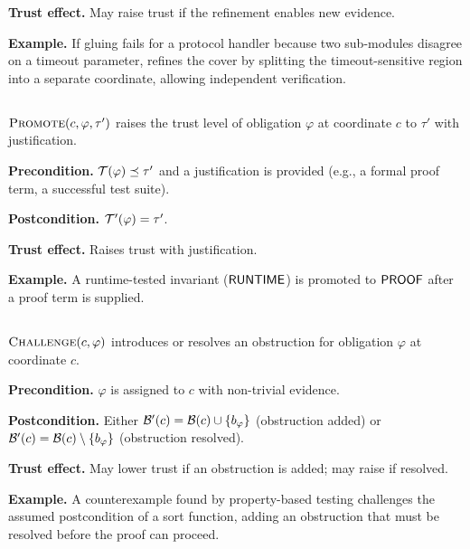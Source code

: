 \documentclass[11pt]{article}
\begin{document}
\noindent\textbf{Trust effect.}
May raise trust if the refinement enables new evidence.

\noindent\textbf{Example.}
If gluing fails for a protocol handler because two sub-modules
disagree on a timeout parameter, \REPAIR{} refines the cover by
splitting the timeout-sensitive region into a separate coordinate,
allowing independent verification.

\subsection{\PROMOTE}\label{sec:move-promote}

\begin{definition}[\PROMOTE]
$\textsc{Promote}(c, \varphi, \tau')$ raises the trust level of obligation
$\varphi$ at coordinate $c$ to $\tau'$ with justification.
\end{definition}

\noindent\textbf{Precondition.}
$\mathcal{T}(\varphi) \preceq \tau'$ and a justification is provided
(e.g., a formal proof term, a successful test suite).

\noindent\textbf{Postcondition.}
$\mathcal{T}'(\varphi) = \tau'$.

\noindent\textbf{Trust effect.}
Raises trust with justification.

\noindent\textbf{Example.}
A runtime-tested invariant ($\mathsf{RUNTIME}$) is promoted to $\mathsf{PROOF}$
after a \LEAN{} proof term is supplied.

\subsection{\CHALLENGE}\label{sec:move-challenge}

\begin{definition}[\CHALLENGE]
$\textsc{Challenge}(c, \varphi)$ introduces or resolves an obstruction
for obligation $\varphi$ at coordinate $c$.
\end{definition}

\noindent\textbf{Precondition.}
$\varphi$ is assigned to $c$ with non-trivial evidence.

\noindent\textbf{Postcondition.}
Either $\mathcal{B}'(c) = \mathcal{B}(c) \cup \{b_\varphi\}$
(obstruction added) or $\mathcal{B}'(c) = \mathcal{B}(c) \setminus \{b_\varphi\}$
(obstruction resolved).

\noindent\textbf{Trust effect.}
May lower trust if an obstruction is added; may raise if resolved.

\noindent\textbf{Example.}
A counterexample found by property-based testing challenges the
assumed postcondition of a sort function, adding an obstruction
that must be resolved before the proof can proceed.
\end{document}
